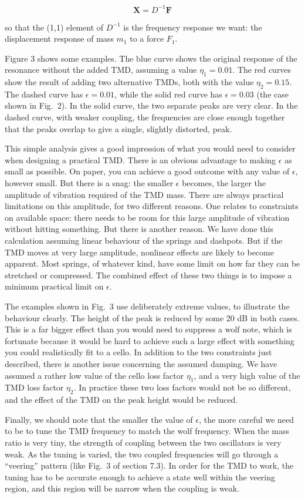   $$\textbf{X} = D^{-1} \textbf{F} \tag{11}$$ 

  so that the (1,1) element of $D^{-1}$ is the frequency response we want: the 
  displacement response of mass $m_1$ to a force $F_1$. 

  Figure 3 shows some examples. The blue curve shows the original response of 
  the resonance without the added TMD, assuming a value $\eta_1 = 0.01$. The 
  red curves show the result of adding two alternative TMDs, both with the 
  value $\eta_2 = 0.15$. The dashed curve has $\epsilon = 0.01$, while the 
  solid red curve has $\epsilon = 0.03$ (the case shown in Fig.\ 2). In the 
  solid curve, the two separate peaks are very clear. In the dashed curve, with 
  weaker coupling, the frequencies are close enough together that the peaks 
  overlap to give a single, slightly distorted, peak. 

  This simple analysis gives a good impression of what you would need to 
  consider when designing a practical TMD. There is an obvious advantage to 
  making $\epsilon$ as small as possible. On paper, you can achieve a good 
  outcome with any value of $\epsilon$, however small. But there is a snag: the 
  smaller $\epsilon$ becomes, the larger the amplitude of vibration required of 
  the TMD mass. There are always practical limitations on this amplitude, for 
  two different reasons. One relates to constraints on available space: there 
  needs to be room for this large amplitude of vibration without hitting 
  something. But there is another reason. We have done this calculation 
  assuming linear behaviour of the springs and dashpots. But if the TMD moves 
  at very large amplitude, nonlinear effects are likely to become apparent. 
  Most springs, of whatever kind, have some limit on how far they can be 
  stretched or compressed. The combined effect of these two things is to impose 
  a minimum practical limit on $\epsilon$. 

  The examples shown in Fig.\ 3 use deliberately extreme values, to illustrate 
  the behaviour clearly. The height of the peak is reduced by some 20 dB in 
  both cases. This is a far bigger effect than you would need to suppress a 
  wolf note, which is fortunate because it would be hard to achieve such a 
  large effect with something you could realistically fit to a cello. In 
  addition to the two constraints just described, there is another issue 
  concerning the assumed damping. We have assumed a rather low value of the 
  cello loss factor $\eta_1$, and a very high value of the TMD loss factor 
  $\eta_2$. In practice these two loss factors would not be so different, and 
  the effect of the TMD on the peak height would be reduced. 

  Finally, we should note that the smaller the value of $\epsilon$, the more 
  careful we need to be to tune the TMD frequency to match the wolf frequency. 
  When the mass ratio is very tiny, the strength of coupling between the two 
  oscillators is very weak. As the tuning is varied, the two coupled 
  frequencies will go through a ``veering'' pattern (like Fig.\ 3 of section 
  7.3). In order for the TMD to work, the tuning has to be accurate enough to 
  achieve a state well within the veering region, and this region will be 
  narrow when the coupling is weak. 